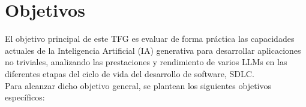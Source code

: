 
\chapter{Objetivos} \label{chap:Goals}

El objetivo principal de este \ac{TFG} es evaluar de forma práctica las capacidades actuales de la Inteligencia Artificial (\ac{IA}) generativa para desarrollar aplicaciones no triviales, analizando las prestaciones y rendimiento de varios \ac{LLMs} en las diferentes etapas del
 ciclo de vida del desarrollo de software, \ac{SDLC}. \\

\noindent Para alcanzar dicho objetivo general, se plantean los siguientes objetivos específicos:

